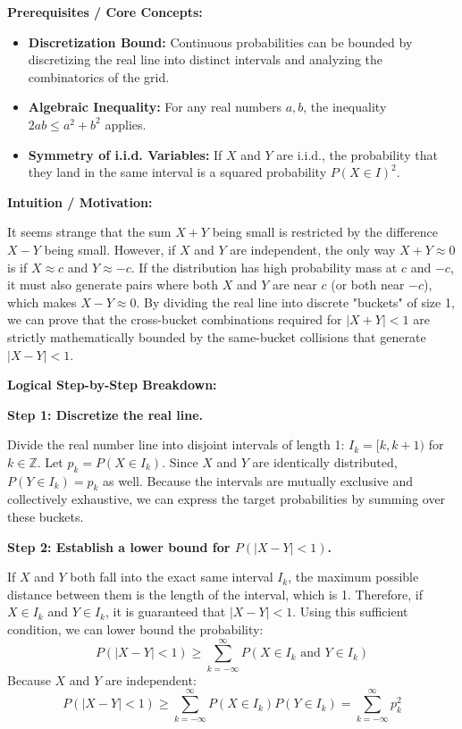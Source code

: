 \begin{solution}
\textbf{Prerequisites / Core Concepts:}
\begin{itemize}
    \item \textbf{Discretization Bound:} Continuous probabilities can be bounded by discretizing the real line into distinct intervals and analyzing the combinatorics of the grid.
    \item \textbf{Algebraic Inequality:} For any real numbers $a, b$, the inequality $2ab \leq a^2 + b^2$ applies.
    \item \textbf{Symmetry of i.i.d. Variables:} If $X$ and $Y$ are i.i.d., the probability that they land in the same interval is a squared probability $P(X \in I)^2$.
\end{itemize}

\textbf{Intuition / Motivation:}

It seems strange that the sum $X+Y$ being small is restricted by the difference $X-Y$ being small. However, if $X$ and $Y$ are independent, the only way $X+Y \approx 0$ is if $X \approx c$ and $Y \approx -c$. If the distribution has high probability mass at $c$ and $-c$, it must also generate pairs where both $X$ and $Y$ are near $c$ (or both near $-c$), which makes $X-Y \approx 0$. By dividing the real line into discrete "buckets" of size 1, we can prove that the cross-bucket combinations required for $|X+Y|<1$ are strictly mathematically bounded by the same-bucket collisions that generate $|X-Y|<1$.

\textbf{Logical Step-by-Step Breakdown:}

\textbf{Step 1: Discretize the real line.}

Divide the real number line into disjoint intervals of length 1: $I_k = [k, k+1)$ for $k \in \mathbb{Z}$.
Let $p_k = P(X \in I_k)$. Since $X$ and $Y$ are identically distributed, $P(Y \in I_k) = p_k$ as well.
Because the intervals are mutually exclusive and collectively exhaustive, we can express the target probabilities by summing over these buckets.

\textbf{Step 2: Establish a lower bound for $P(|X-Y| < 1)$.}

If $X$ and $Y$ both fall into the exact same interval $I_k$, the maximum possible distance between them is the length of the interval, which is 1.
Therefore, if $X \in I_k$ and $Y \in I_k$, it is guaranteed that $|X-Y| < 1$.
Using this sufficient condition, we can lower bound the probability:
\[ P(|X-Y| < 1) \geq \sum_{k=-\infty}^\infty P(X \in I_k \text{ and } Y \in I_k) \]
Because $X$ and $Y$ are independent:
\[ P(|X-Y| < 1) \geq \sum_{k=-\infty}^\infty P(X \in I_k) P(Y \in I_k) = \sum_{k=-\infty}^\infty p_k^2 \]


\end{solution}

